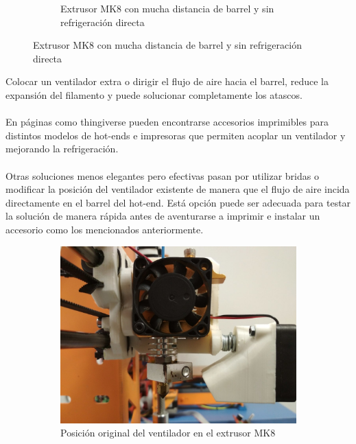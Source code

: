 \documentclass[11pt,a4paper]{article}
\begin{document}
\begin{figure}[H]
\begin{subfigure}[b]{0.4\textwidth}
		\caption*{Extrusor MK8 con mucha distancia de barrel y sin refrigeración directa}
    \end{subfigure}
\end{figure}
Colocar un ventilador extra o dirigir el flujo de aire hacia el barrel, reduce la expansión del filamento y puede solucionar completamente los atascos.\\\\
En páginas como thingiverse pueden encontrarse accesorios imprimibles para distintos modelos de hot-ends e impresoras que permiten acoplar un ventilador y mejorando la refrigeración.\\\\
Otras soluciones menos elegantes pero efectivas pasan por utilizar bridas o modificar la posición del ventilador existente de manera que el flujo de aire incida directamente en el barrel del hot-end. Está opción puede ser adecuada para testar la solución de manera rápida antes de aventurarse a imprimir e instalar un accesorio como los mencionados anteriormente.\begin{figure}[H]
    \centering
    \begin{subfigure}[b]{0.4\textwidth}
        \includegraphics[width=\textwidth,cfbox=azul_marcos 4pt 0pt]{FOTOS/MK8_FAN_TRICK1}
		\caption*{Posición original del ventilador en el extrusor MK8}
    \end{subfigure}
    ~ \qquad%
    \begin{subfigure}[b]{0.4\textwidth}

\end{subfigure}
\end{figure}
\end{document}
